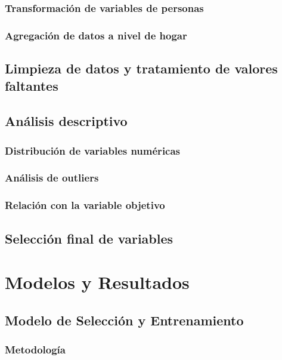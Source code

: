 \documentclass[12pt,a4paper,onecolumn]{article}
\begin{document}
\subsubsection{Transformación de variables de personas}

\subsubsection{Agregación de datos a nivel de hogar}

\subsection{Limpieza de datos y tratamiento de valores faltantes}

\subsection{Análisis descriptivo}

\subsubsection{Distribución de variables numéricas}

\subsubsection{Análisis de outliers}

\subsubsection{Relación con la variable objetivo}

\subsection{Selección final de variables}

\section{Modelos y Resultados}

\subsection{Modelo de Selección y Entrenamiento}

\subsubsection{Metodología}
\end{document}
